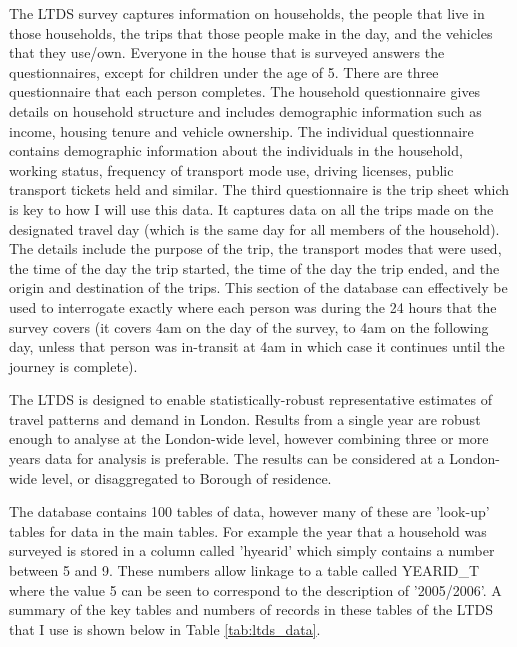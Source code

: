 The LTDS survey captures information on households, the people that live in those households, the trips that those people make in the day, and the vehicles that they use/own. Everyone in the house that is surveyed answers the questionnaires, except for children under the age of 5. There are three questionnaire that each person completes. The household questionnaire gives details on household structure and includes demographic information such as income, housing tenure and vehicle ownership. The individual questionnaire contains demographic information about the individuals in the household, working status, frequency of transport mode use, driving licenses, public transport tickets held and similar. The third questionnaire is the trip sheet which is key to how I will use this data. It captures data on all the trips made on the designated travel day (which is the same day for all members of the household). The details include the purpose of the trip, the transport modes that were used, the time of the day the trip started, the time of the day the trip ended, and the origin and destination of the trips. This section of the database can effectively be used to interrogate exactly where each person was during the 24 hours that the survey covers (it covers 4am on the day of the survey, to 4am on the following day, unless that person was in-transit at 4am in which case it continues until the journey is complete).

The LTDS is designed to enable statistically-robust representative estimates of travel patterns and demand in London. Results from a single year are robust enough to analyse at the London-wide level, however combining three or more years data for analysis is preferable. The results can be considered at a London-wide level, or disaggregated to Borough of residence.

The database contains 100 tables of data, however many of these are 'look-up' tables for data in the main tables. For example the year that a household was surveyed is stored in a column called 'hyearid' which simply contains a number between 5 and 9. These numbers allow linkage to a table called YEARID\_T where the value 5 can be seen to correspond to the description of '2005/2006'. A summary of the key tables and numbers of records in these tables of the LTDS that I use is shown below in Table \ref{tab:ltds_data}.

